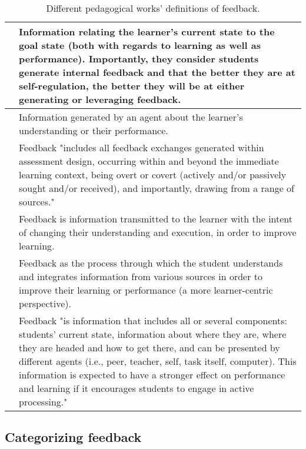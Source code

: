 \begin{table*}[h]
\begin{tabularx}{\textwidth}{p{3.95cm}|X}
    \midrule
    \citet{nicol_formative_2006} & Information relating the learner's current state to the goal state (both with regards to learning as well as performance). Importantly, they consider students generate internal feedback and that the better they are at self-regulation, the better they will be at either generating or leveraging feedback. \\
    \midrule
    \citet{hattie_power_2007} & Information generated by an agent about the learner's understanding or their performance. \\
    \midrule
    \citet{evans_making_2013} & Feedback "includes all feedback exchanges generated within assessment design, occurring within and beyond the immediate learning context, being overt or covert (actively and/or passively sought and/or received), and importantly, drawing from a range of sources." \\
    \midrule
    \citet{anastasiya_a_lipnevich_david_a_g_berg_jeffrey_k_smith_toward_2016} & Feedback is information transmitted to the learner with the intent of changing their understanding and execution, in order to improve learning. \\
    \midrule
    \citet{carless_development_2018} & Feedback as the process through which the student understands and integrates information from various sources in order to improve their learning or performance (a more learner-centric perspective). \\
    \midrule
    \citet{lipnevich_review_2021} & Feedback "is information that includes all or several components: students’ current state, information about where they are, where they are headed and how to get there, and can be presented by different agents (i.e., peer, teacher, self, task itself, computer). This information is expected to have a stronger effect on performance and learning if it encourages students to engage in active processing." \\
    \bottomrule
  \end{tabularx}
  \caption{Different pedagogical works' definitions of feedback.}
  \label{tab:feedback_defintions}
\end{table*}


\subsection{Categorizing feedback}

